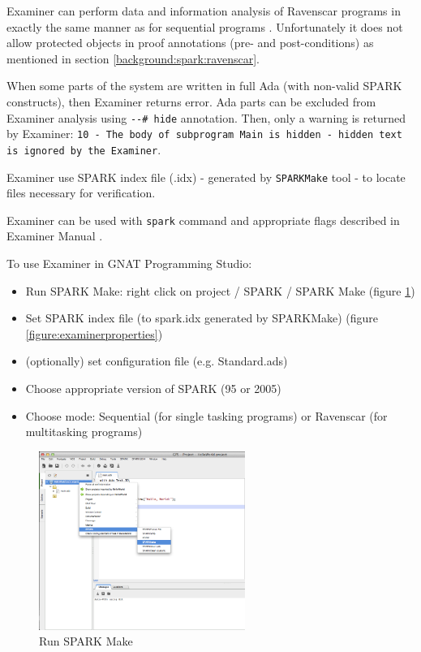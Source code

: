 Examiner can perform data and information analysis of Ravenscar programs in exactly the same manner as for sequential programs \cite{Ravenscar:Online}. Unfortunately it does not allow protected objects in proof annotations (pre- and post-conditions) as mentioned in section \ref{background:spark:ravenscar}.

When some parts of the system are written in full Ada (with non-valid SPARK constructs), then Examiner returns error. Ada parts can be excluded from Examiner analysis using \lstinline{--# hide} annotation. Then, only a warning is returned by Examiner: \lstinline{10 - The body of subprogram Main is hidden - hidden text is ignored by the Examiner}.

Examiner use SPARK index file (.idx) - generated by \lstinline{SPARKMake} tool -  to locate files necessary for verification. \cite{Barnes:Book}

Examiner can be used with \lstinline{spark} command and appropriate flags described in Examiner Manual \cite{Examiner:Online}.


To use Examiner in GNAT Programming Studio:
\begin{itemize}
	\item Run SPARK Make: right click on project / SPARK / SPARK Make (figure \ref{figure:sparkmake})
	\item Set SPARK index file (to spark.idx generated by SPARKMake) (figure \ref{figure:examinerproperties})
	\item (optionally) set configuration file (e.g. Standard.ads)
	\item Choose appropriate version of SPARK (95 or 2005)
	\item Choose mode: Sequential (for single tasking programs) or Ravenscar (for multitasking programs)
\end{itemize}

\begin{figure}[ht]%
    \begin{center}
    	\includegraphics[width=0.6\textwidth]{figures/SPARKMake.png}    	
    \end{center}
    \caption{Run SPARK Make}
    \label{figure:sparkmake}
\end{figure}

